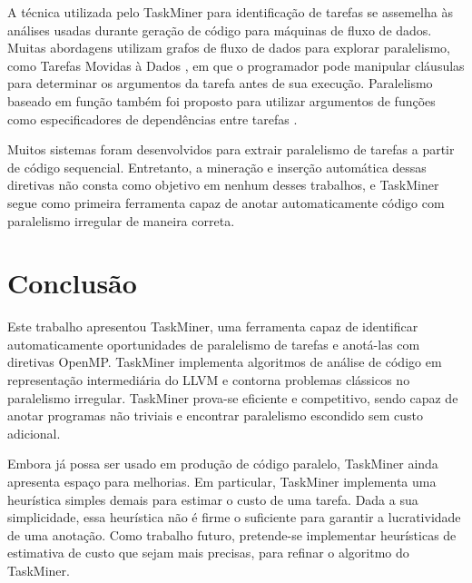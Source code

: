 \documentclass[sigplan,10pt]{acmart}
\newcommand\Taskminer{\mbox{\textsf{TaskMiner}}}
\begin{document}
A técnica utilizada pelo {\Taskminer} para identificação de tarefas se assemelha às análises usadas durante
geração de código para máquinas de fluxo de dados. Muitas abordagens utilizam grafos
de fluxo de dados para explorar paralelismo, como Tarefas Movidas à Dados \cite{tasirlar:icpp:2011},
em que o programador pode manipular cláusulas para determinar os argumentos da tarefa
antes de sua execução. Paralelismo baseado em função também foi proposto
para utilizar argumentos de funções como especificadores de dependências entre tarefas \cite{gupta:micro:2011}.

Muitos sistemas foram desenvolvidos para extrair paralelismo de tarefas a partir de código sequencial.
Entretanto, a mineração e inserção automática dessas diretivas não consta como objetivo
em nenhum desses trabalhos, e \Taskminer{} segue como primeira ferramenta capaz 
de anotar automaticamente código com paralelismo irregular
de maneira correta.



\section{Conclus\~{a}o}
\label{sec:conc}

Este trabalho apresentou \Taskminer{}, uma ferramenta capaz de identificar automaticamente oportunidades de paralelismo de tarefas e anotá-las com diretivas OpenMP. \Taskminer{} implementa algoritmos de análise de código em representação intermediária do LLVM e contorna problemas clássicos no paralelismo irregular. \Taskminer{} prova-se eficiente e competitivo, sendo capaz de anotar programas não triviais e encontrar paralelismo escondido sem custo adicional. 

Embora já possa ser usado em produção de código paralelo, \Taskminer{} ainda apresenta espaço
para melhorias.
Em particular, \Taskminer{} implementa uma heurística simples demais para estimar o custo de uma tarefa.
Dada a sua simplicidade, essa heurística não é firme o suficiente para garantir a lucratividade de uma anotação. Como trabalho futuro, pretende-se implementar heurísticas de estimativa de custo que sejam mais precisas, para refinar o algoritmo do \Taskminer{}.


\end{document}
